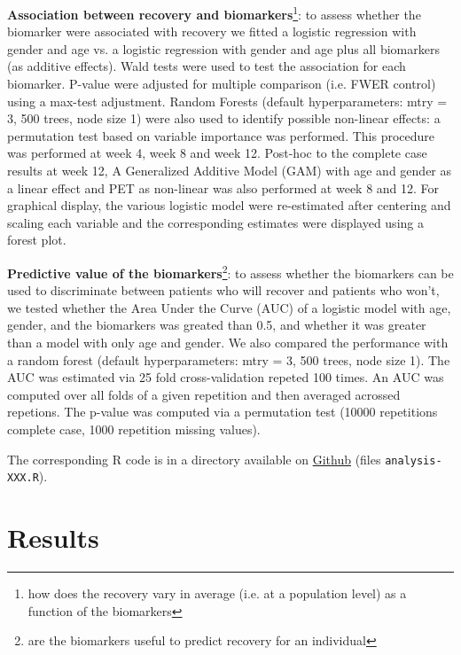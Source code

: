 \documentclass[12pt]{article}
\begin{document}
\bigskip

\textbf{Association between recovery and biomarkers}\footnote{how does the
recovery vary in average (i.e. at a population level) as a function of
the biomarkers}: to assess whether the biomarker were associated with
recovery we fitted a logistic regression with gender and age vs. a
logistic regression with gender and age plus all biomarkers (as
additive effects). Wald tests were used to test the association for
each biomarker. P-value were adjusted for multiple comparison
(i.e. FWER control) using a max-test adjustment. Random Forests
(default hyperparameters: mtry = 3, 500 trees, node size 1) were also
used to identify possible non-linear effects: a permutation test based
on variable importance was performed. \newline This procedure was
performed at week 4, week 8 and week 12. Post-hoc to the complete case
results at week 12, A Generalized Additive Model (GAM) with age and
gender as a linear effect and PET as non-linear was also performed at
week 8 and 12. \newline For graphical display, the various logistic
model were re-estimated after centering and scaling each variable and
the corresponding estimates were displayed using a forest plot.

\bigskip

\textbf{Predictive value of the biomarkers}\footnote{are the biomarkers useful to
 predict recovery for an individual}: to assess whether the biomarkers
 can be used to discriminate between patients who will recover and
 patients who won't, we tested whether the Area Under the Curve (AUC)
 of a logistic model with age, gender, and the biomarkers was greated
 than 0.5, and whether it was greater than a model with only age and
 gender. We also compared the performance with a random forest
 (default hyperparameters: mtry = 3, 500 trees, node size 1). The AUC
 was estimated via 25 fold cross-validation repeted 100 times. An AUC
 was computed over all folds of a given repetition and then averaged
 acrossed repetions. The p-value was computed via a permutation test
 (10000 repetitions complete case, 1000 repetition missing values).

\bigskip

The corresponding R code is in a directory available on
\href{https://github.com/bozenne/article-predictionNP1BD3/tree/master/code-data-analysis}{Github} (files \texttt{analysis-XXX.R}). 

\clearpage

\section{Results}
\label{sec:org57da83a}
\end{document}
